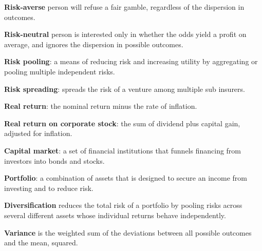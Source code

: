 \begin{keyterms}
\textbf{Risk-averse} person will refuse a fair gamble, regardless of the dispersion in outcomes.

\textbf{Risk-neutral} person is interested only in whether the odds yield a profit on average, and ignores the dispersion in possible outcomes.

\textbf{Risk pooling}: a means of reducing risk and increasing utility by aggregating or pooling multiple independent risks.

\textbf{Risk spreading}: spreads the risk of a venture among multiple sub insurers.

\textbf{Real return}: the nominal return minus the rate of inflation.

\textbf{Real return on corporate stock}: the sum of dividend plus capital gain, adjusted for inflation. 

\textbf{Capital market}: a set of financial institutions that funnels financing from investors into bonds and stocks.

\textbf{Portfolio}: a combination of assets that is designed to secure an income from investing and to reduce risk.

\textbf{Diversification} reduces the total risk of a portfolio by pooling risks across several different assets whose individual returns behave independently.

\textbf{Variance} is the weighted sum of the deviations between all possible outcomes and the mean, squared.
\end{keyterms}